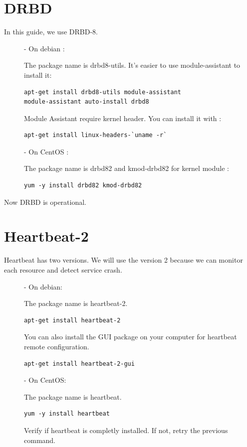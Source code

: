 \documentclass[a4paper,10pt]{report}
\begin{document}
\section{DRBD}
In this guide, we use DRBD-8.
\begin{description}
\item[]- On debian :

The package name is drbd8-utils. It's easier to use module-assistant to install it:
\begin{lstlisting}
apt-get install drbd8-utils module-assistant
module-assistant auto-install drbd8
\end{lstlisting} 



Module Assistant require kernel header. You can install it with :
\begin{lstlisting}
apt-get install linux-headers-`uname -r`
\end{lstlisting}

\item[]- On CentOS :

The package name is drbd82 and kmod-drbd82 for kernel module :
\begin{lstlisting}
yum -y install drbd82 kmod-drbd82
\end{lstlisting} 

\end{description}

Now DRBD is operational.


\section{Heartbeat-2}
Heartbeat has two versions. We will use the version 2 because we can monitor each resource and detect service crash.
\begin{description}
\item[]- On debian:

The package name is heartbeat-2.
\begin{lstlisting}
apt-get install heartbeat-2
\end{lstlisting}
You can also install the GUI package on your computer for heartbeat remote configuration.
\begin{lstlisting}
apt-get install heartbeat-2-gui
\end{lstlisting}

\item[]- On CentOS:

The package name is heartbeat.
\begin{lstlisting}
yum -y install heartbeat
\end{lstlisting}
Verify if heartbeat is completly installed. If not, retry the previous command.

\end{description}
\end{document}
